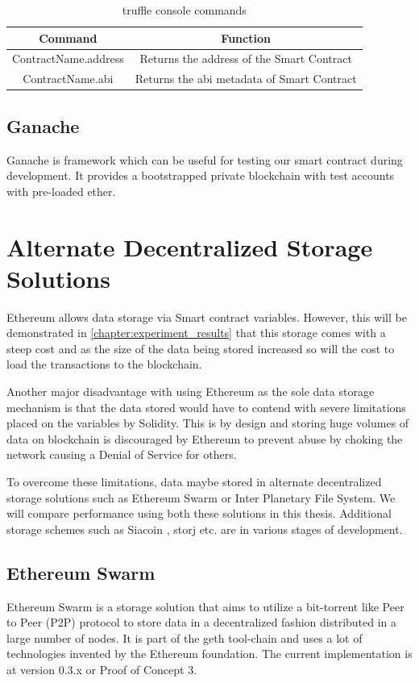 \documentclass[11pt,openright]{report}
\begin{document}
\begin{table}[!htbp]
	\renewcommand{\arraystretch}{1.3}
	\caption{truffle console commands}
	\label{truffle_console}
	\centering
	\begin{tabular}{|c|c|}
		\hline
		\bfseries Command & \bfseries Function \\
		\hline\hline
		ContractName.address & Returns the address of the Smart Contract \\ \hline
		ContractName.abi & Returns the abi metadata of Smart Contract \\ \hline

	\end{tabular}
\end{table}

\subsection{Ganache}
Ganache is framework which can be useful for testing our smart contract during development. It provides a bootstrapped private blockchain with test accounts with pre-loaded ether.

\section{Alternate Decentralized Storage Solutions}
Ethereum allows data storage via Smart contract variables. However, this will be demonstrated in \ref{chapter:experiment_results} that this storage comes with a steep cost and as the size of the data being stored increased so will the cost to load the transactions to the blockchain.

Another major disadvantage with using Ethereum as the sole data storage mechanism is that the data stored would have to contend with severe limitations placed on the variables by Solidity. This is by design and storing huge volumes of data on blockchain is discouraged by Ethereum to prevent abuse by choking the network causing a Denial of Service for others.

To overcome these limitations, data maybe stored in alternate decentralized storage solutions such as Ethereum Swarm or Inter Planetary File System. We will compare performance using both these solutions in this thesis. Additional storage schemes such as Siacoin \cite{vorick2014sia}, storj \cite{wilkinsonetal2014storj} etc. are in various stages of development.

\subsection{Ethereum Swarm}
Ethereum Swarm \cite{swarm} is a storage solution that aims to utilize a bit-torrent like Peer to Peer (P2P) protocol to store data  in a decentralized fashion distributed in a large number of nodes. It is part of the geth tool-chain and uses a lot of technologies invented by the Ethereum foundation. The current implementation is at version 0.3.x or Proof of Concept 3. 
\end{document}
